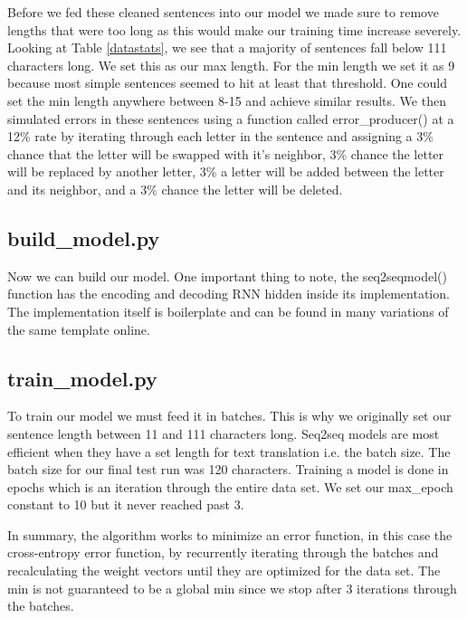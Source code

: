 \documentclass[11pt,a4paper]{scrartcl}
\theoremstyle{definition}
\begin{document}
Before we fed these cleaned sentences into our model we made sure to remove lengths that were too long as this would make our training time increase severely. Looking at Table \ref{datastats}, we see that a majority of sentences fall below 111 characters long. We set this as our max length. For the min length we set it as 9 because most simple sentences seemed to hit at least that threshold. One could set the min length anywhere between 8-15 and achieve similar results. We then simulated errors in these sentences using a function called error\_producer() at a 12\% rate by iterating through each letter in the sentence and assigning a 3\% chance that the letter will be swapped with it’s neighbor, 3\% chance the letter will be replaced by another letter, 3\% a letter will be added between the letter and its neighbor, and a 3\% chance the letter will be deleted.

\subsection{build\_model.py}
Now we can build our model. One important thing to note, the seq2seqmodel() function has the encoding and decoding RNN hidden inside its implementation. The implementation itself is boilerplate and can be found in many variations of the same template online.

\vspace{1em}
\subsection{train\_model.py}
To train our model we must feed it in batches. This is why we originally set our sentence length between 11 and 111 characters long. Seq2seq models are most efficient when they have a set length for text translation i.e. the batch size. The batch size for our final test run was 120 characters. Training a model is done in epochs which is an iteration through the entire data set. We set our max\_epoch constant to 10 but it never reached past 3.\newline


\vspace{1em}
In summary, the algorithm works to minimize an error function, in this case the cross-entropy error function, by recurrently iterating through the batches and recalculating the weight vectors until they are optimized for the data set. The min is not guaranteed to be a global min since we stop after 3 iterations through the batches.
\end{document}
